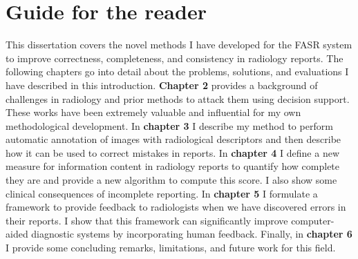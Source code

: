 \section{Guide for the reader}
This dissertation covers the novel methods I have developed for the FASR system to improve correctness, completeness, and consistency in radiology reports. The following chapters go into detail about the problems, solutions, and evaluations I have described in this introduction. \textbf{Chapter 2} provides a background of challenges in radiology and prior methods to attack them using decision support. These works have been extremely valuable and influential for my own methodological development. In \textbf{chapter 3} I describe my method to perform automatic annotation of images with radiological descriptors and then describe how it can be used to correct mistakes in reports. In \textbf{chapter 4} I define a new measure for information content in radiology reports to quantify how complete they are and provide a new algorithm to compute this score. I also show some clinical consequences of incomplete reporting. In \textbf{chapter 5} I formulate a framework to provide feedback to radiologists when we have discovered errors in their reports. I show that this framework can significantly improve computer-aided diagnostic systems by incorporating human feedback. Finally, in \textbf{chapter 6} I provide some concluding remarks, limitations, and future work for this field.